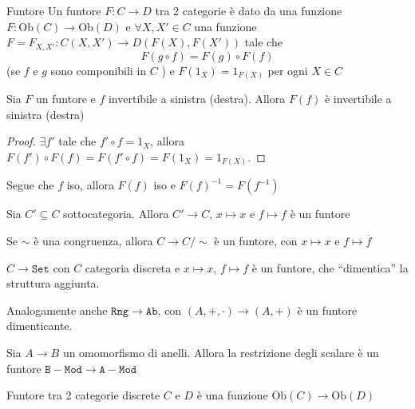 \begin{definition}{Funtore}
    Un funtore \(F : C \to D\) tra 2 categorie è dato da una funzione
    \(F : \mathrm{Ob}{(C)} \to \mathrm{Ob}{(D)}\) e \(\forall X, X' \in C\) una
    funzione \(F = F_{X, X'} : C{(X, X')} \to D{(F{(X)}, F{(X')})}\) tale che
    \[
      F{(g\circ f)} = F{(g)}\circ F{(f)} 
    \]
    (se \(f\) e \(g\) sono componibili in \(C\) ) e \(F{(1_X)} = 1_{F{(X)}} \)
    per ogni \(X \in C\) 
    
\end{definition}
\begin{proposition}{}
    Sia \(F\) un funtore e \(f\) invertibile a sinistra (destra). Allora \(F{(f)}\) è invertibile a sinistra (destra)
\end{proposition}
\begin{proof}{}
    \(\exists f'\) tale che \(f' \circ f = 1_X\), allora \(F{(f')} \circ F{(f)} = F{(f'\circ f)} = F{(1_X)} = 1_{F{(X)}} \).
\end{proof}
\begin{remark}{}
    Segue che \(f\) iso, allora \(F{(f)}\) iso e \(F{(f)}^{-1} = F{(f^{-1})}\) 
\end{remark}

\begin{example}{}
    Sia \(C' \subseteq C \) sottocategoria. Allora \(C' \to C\), \(x \mapsto x\) e \(f \mapsto f\) è un funtore
\end{example}

\begin{example}{}
    Se \(\sim \) è una congruenza, allora \(C \to C /\sim\) è un funtore, con
    \(x \mapsto x\) e \(f \mapsto \overline{f}\) 
\end{example}

\begin{example}
    \(C \to \mathtt{Set}\) con \(C\) categoria discreta e \(x \mapsto x\), \(f
    \mapsto f\) è un funtore, che ``dimentica'' la struttura aggiunta.

    Analogamente anche \(\mathtt{Rng} \to \mathtt{Ab}\), con \({(A, +, \cdot )} \to {(A, +)}\) è un funtore dimenticante.
\end{example}

\begin{example}{}
    Sia \(A \to B\) un omomorfismo di anelli. Allora la restrizione degli
    scalare è un funtore \(\mathtt{B-Mod} \to \mathtt{A-Mod}\) 
\end{example}


\begin{example}{}
    Funtore tra 2 categorie discrete \(C\) e \(D\) è una funzione \(\mathrm{Ob}{(C)} \to \mathrm{Ob}{(D)}\) 
\end{example}

